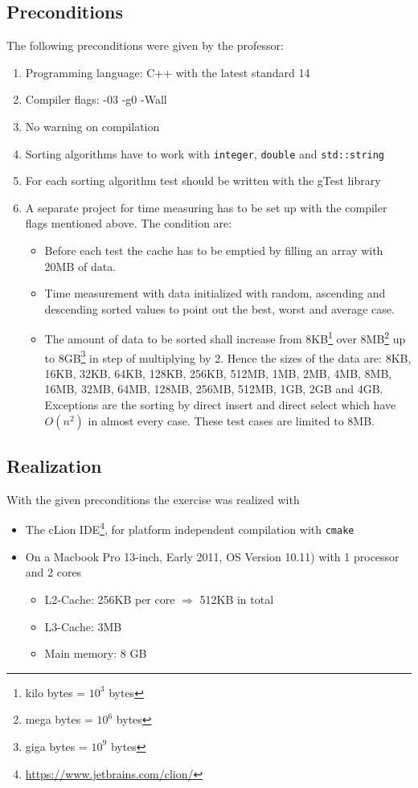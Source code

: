 \documentclass[11pt]{amsart}
\begin{document}
\subsection{Preconditions}
The following preconditions were given by the professor:
\begin{enumerate}
	\item Programming language: C++ with the latest standard 14
	\item Compiler flags: -03 -g0 -Wall
	\item No warning on compilation
	\item Sorting algorithms have to work with \texttt{integer}, \texttt{double} and \texttt{std::string}
	\item For each sorting algorithm test should be written with the gTest library
	\item A separate project for time measuring has to be set up with the compiler flags mentioned above. The condition are:
	\begin{itemize}
		\item Before each test the cache has to be emptied by filling an array with 20MB of data.
		\item Time measurement with data initialized with random, ascending and descending sorted values to point out the best, worst and average case.
		\item The amount of data to be sorted shall increase from 8KB\footnote{kilo bytes = $10^3$ bytes} over 8MB\footnote{mega bytes = $10^6$ bytes} up to 8GB\footnote{giga bytes = $10^9$ bytes} in step of multiplying by 2. Hence the sizes of the data are: 8KB, 16KB, 32KB, 64KB, 128KB, 256KB, 512MB, 1MB, 2MB, 4MB, 8MB, 16MB, 32MB, 64MB, 128MB, 256MB, 512MB, 1GB, 2GB and 4GB. Exceptions are the sorting by direct insert and direct select which have $O(n^2)$ in almost every case. These test cases are limited to 8MB.
	\end{itemize}
\end{enumerate}

\subsection{Realization}
With the given preconditions the exercise was realized with
\begin{itemize}
	\item The cLion IDE\footnote{\url{https://www.jetbrains.com/clion/}}, for platform independent compilation with \texttt{cmake}
	\item On a Macbook Pro 13-inch, Early 2011, OS Version 10.11) with 1 processor and 2 cores
	\begin{itemize}
		\item L2-Cache: 256KB per core $\Rightarrow$ 512KB in total
		\item L3-Cache: 3MB
		\item Main memory: 8 GB
	\end{itemize}
\end{itemize}
\end{document}
